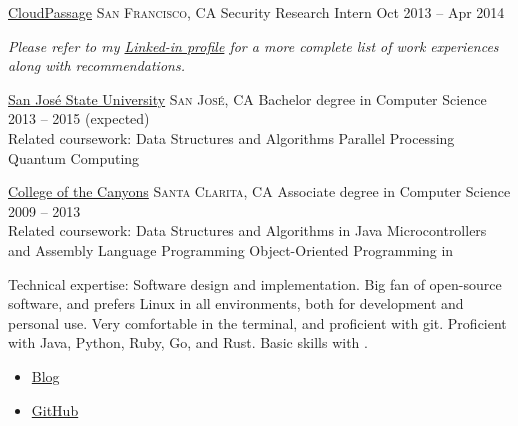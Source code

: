 \documentclass[10pt]{article}
\begin{document}
\headedsection  %
  {\href{http://www.cloudpassage.com}{CloudPassage}}
  {\textsc{San Francisco, CA}} {%
  \headedsubsection
    {Security Research Intern}
    {Oct 2013 -- Apr 2014}
    {}
}

\vspace{-0.2em}
\begin{center}
  \emph{\small Please refer to my \href{http://www.linkedin.com/in/skylerhawthorne}{Linked-in profile} for a more complete list of work experiences along with recommendations.}
\end{center}


\spacedhrule{-0.2em}{-0.4em}


\headedsection
  {\href{http://www.sjsu.edu/}{San Jos\'{e} State University}}
  {\textsc{San Jos\'{e}, CA}} {%
  \headedsubsection
    {Bachelor degree in Computer Science}
    {2013 -- 2015 (expected)}
    {
		\\
		Related coursework: Data Structures and Algorithms \sbull
		Parallel Processing \sbull
		Quantum Computing
	}
}

\headedsection
  {\href{http://www.canyons.edu/}{College of the Canyons}}
  {\textsc{Santa Clarita, CA}} {%
  \headedsubsection
    {Associate degree in Computer Science}
    {2009 -- 2013} {
		\\
		Related coursework: Data Structures and Algorithms in Java \sbull
		Microcontrollers and Assembly Language Programming \sbull
		Object-Oriented Programming in \CPP
	}
}

\spacedhrule{0.5em}{-0.4em}


\inlineheadsection  %
  {Technical expertise:}
  {Software design and implementation. Big fan of open-source software, and prefers Linux in all environments, both for development and personal use. Very comfortable in the terminal, and proficient with git. Proficient with Java, Python, Ruby, Go, and Rust. Basic skills with \CPP.}

\begin{itemize}
	\item{\href{http://dead10ck.github.io/}{Blog}}
	\item{\href{https://github.com/dead10ck}{GitHub}}
\end{itemize}
\end{document}
